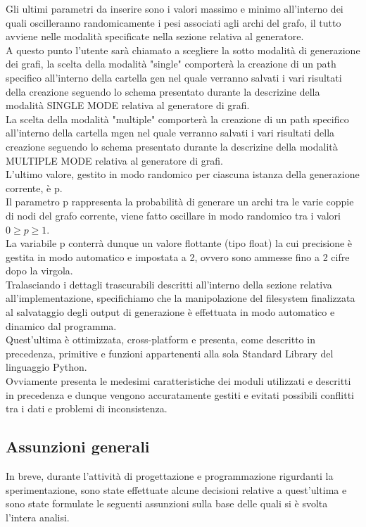 Gli ultimi parametri da inserire sono i valori massimo e minimo all'interno dei quali oscilleranno randomicamente i pesi associati agli archi del grafo, il tutto avviene nelle modalità specificate nella sezione relativa al generatore.\\

A questo punto l'utente sarà chiamato a scegliere la sotto modalità di generazione dei grafi, la scelta della modalità "single" comporterà la creazione di un path specifico all'interno della cartella gen nel quale verranno salvati i vari risultati della creazione seguendo lo schema presentato durante la descrizine della modalità SINGLE MODE relativa al generatore di grafi.\\
La scelta della modalità "multiple" comporterà la creazione di un path specifico all'interno della cartella mgen nel quale verranno salvati i vari risultati della creazione seguendo lo schema presentato durante la descrizine della modalità MULTIPLE MODE relativa al generatore di grafi. \\

L'ultimo valore, gestito in modo randomico per ciascuna istanza della generazione corrente, è p.\\
Il parametro p rappresenta la probabilità di generare un archi tra le varie coppie di nodi del grafo corrente, viene fatto oscillare in modo randomico tra i valori \(0 \geq p \geq 1\).\\
La variabile p conterrà dunque un valore flottante (tipo float) la cui precisione è gestita in modo automatico e impostata a 2, ovvero sono ammesse fino a 2 cifre dopo la virgola.\\

Tralasciando i dettagli trascurabili descritti all'interno della sezione relativa all'implementazione, specifichiamo che la manipolazione del filesystem finalizzata al salvataggio degli output di generazione è effettuata in modo automatico e dinamico dal programma.\\
Quest'ultima è ottimizzata, cross-platform e presenta, come descritto in precedenza, primitive e funzioni appartenenti alla sola Standard Library del linguaggio Python.\\
Ovviamente presenta le medesimi caratteristiche dei moduli utilizzati e descritti in precedenza e dunque vengono accuratamente gestiti e evitati possibili conflitti tra i dati e problemi di inconsistenza.\\

\subsection{Assunzioni generali}
\justify
In breve, durante l'attività di progettazione e programmazione rigurdanti la sperimentazione, sono state effettuate alcune decisioni relative a quest'ultima e sono state formulate le seguenti assunzioni sulla base delle quali si è svolta l'intera analisi.\\

